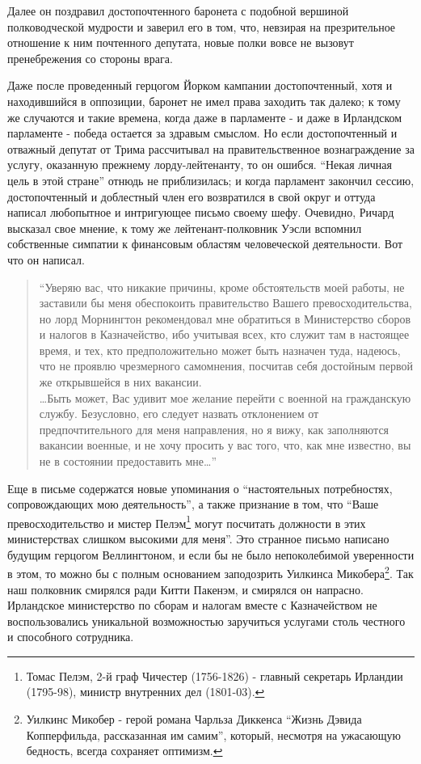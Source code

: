 \documentclass[
  oneside,
  12pt,
  titlepage]{book}
\begin{document}
Далее он поздравил достопочтенного баронета с подобной вершиной полководческой мудрости и заверил его в том, что, невзирая на презрительное отношение к ним почтенного депутата, новые полки вовсе не вызовут пренебрежения со стороны врага.

Даже после проведенный герцогом Йорком кампании достопочтенный, хотя и находившийся в оппозиции, баронет не имел права заходить так далеко; к тому же случаются и такие времена, когда даже в парламенте - и даже в Ирландском парламенте - победа остается за здравым смыслом. Но если достопочтенный и отважный депутат от Трима рассчитывал на правительственное вознаграждение за услугу, оказанную прежнему лорду-лейтенанту, то он ошибся. ``Некая личная цель в этой стране'' отнюдь не приблизилась; и когда парламент закончил сессию, достопочтенный и доблестный член его возвратился в свой округ и оттуда написал любопытное и интригующее письмо своему шефу. Очевидно, Ричард высказал свое мнение, к тому же лейтенант-полковник Уэсли вспомнил собственные симпатии к финансовым областям человеческой деятельности. Вот что он написал.

\begin{quote}
``Уверяю вас, что никакие причины, кроме обстоятельств моей работы, не заставили бы меня обеспокоить правительство Вашего превосходительства, но лорд Морнингтон рекомендовал мне обратиться в Министерство сборов и налогов в Казначейство, ибо учитывая всех, кто служит там в настоящее время, и тех, кто предположительно может быть назначен туда, надеюсь, что не проявлю чрезмерного самомнения, посчитав себя достойным первой же открывшейся в них вакансии.\\
\ldots Быть может, Вас удивит мое желание перейти с военной на гражданскую службу. Безусловно, его следует назвать отклонением от предпочтительного для меня направления, но я вижу, как заполняются вакансии военные, и не хочу просить у вас того, что, как мне известно, вы не в состоянии предоставить мне\ldots{}''
\end{quote}

Еще в письме содержатся новые упоминания о ``настоятельных потребностях, сопровождающих мою деятельность'', а также признание в том, что ``Ваше превосходительство и мистер Пелэм\footnote{Томас Пелэм, 2-й граф Чичестер (1756-1826) - главный секретарь Ирландии (1795-98), министр внутренних дел (1801-03).} могут посчитать должности в этих министерствах слишком высокими для меня''. Это странное письмо написано будущим герцогом Веллингтоном, и если бы не было непоколебимой уверенности в этом, то можно бы с полным основанием заподозрить Уилкинса Микобера\footnote{Уилкинс Микобер - герой романа Чарльза Диккенса ``Жизнь Дэвида Копперфильда, рассказанная им самим'', который, несмотря на ужасающую бедность, всегда сохраняет оптимизм.}. Так наш полковник смирялся ради Китти Пакенэм, и смирялся он напрасно. Ирландское министерство по сборам и налогам вместе с Казначейством не воспользовались уникальной возможностью заручиться услугами столь честного и способного сотрудника.
\end{document}
